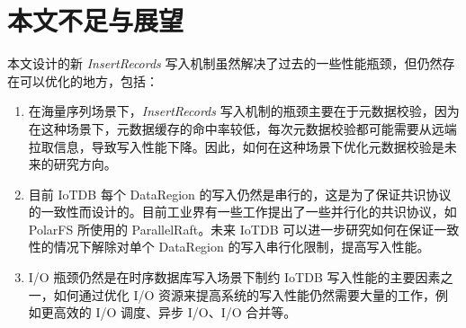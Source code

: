 \section{本文不足与展望}
本文设计的新 \emph{InsertRecords} 写入机制虽然解决了过去的一些性能瓶颈，但仍然存在可以优化的地方，包括：
\begin{enumerate}
  \item 在海量序列场景下，\emph{InsertRecords} 写入机制的瓶颈主要在于元数据校验，因为在这种场景下，元数据缓存的命中率较低，每次元数据校验都可能需要从远端拉取信息，导致写入性能下降。因此，如何在这种场景下优化元数据校验是未来的研究方向。
  \item 目前 IoTDB 每个 DataRegion 的写入仍然是串行的，这是为了保证共识协议的一致性而设计的。目前工业界有一些工作提出了一些并行化的共识协议，如 PolarFS 所使用的 ParallelRaft\cite{cao2018polarfs}。未来 IoTDB 可以进一步研究如何在保证一致性的情况下解除对单个 DataRegion 的写入串行化限制，提高写入性能。
  \item I/O 瓶颈仍然是在时序数据库写入场景下制约 IoTDB 写入性能的主要因素之一，如何通过优化 I/O 资源来提高系统的写入性能仍然需要大量的工作，例如更高效的 I/O 调度、异步 I/O、I/O 合并等。
\end{enumerate}